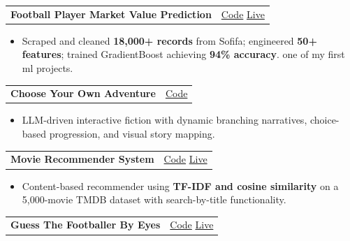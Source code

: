 \documentclass[10.5pt, a4paper]{article}
\makeatletter
\newcommand{\proj}[3]{%
  \vspace{1pt}%
  \begin{tabularx}{\linewidth}{@{}X r@{}}
    \textbf{#1}\enspace{\small\color{mid}\textit{#2}} & {\small #3}
  \end{tabularx}\vspace{0pt}}
\makeatother
\begin{document}
\proj{Football Player Market Value Prediction}
     {--- ML Pipeline}
     {\href{https://github.com/paudelsamir/Player-Value-Prediction}{Code}
      \enspace\textbar\enspace
      \href{https://paudelsamir.streamlit.app/}{Live}}

\begin{itemize}
  \item Scraped and cleaned \textbf{18,000+ records} from Sofifa; engineered \textbf{50+ features};
        trained GradientBoost achieving \textbf{94\% accuracy}. one of my first ml projects.
\end{itemize}

\vspace{4pt}

\proj{Choose Your Own Adventure}
     {--- GenAI Application}
     {\href{https://github.com/paudelsamir/Choose-Your-Own-Adventure}{Code}}

\begin{itemize}
  \item LLM-driven interactive fiction with dynamic branching narratives,
        choice-based progression, and visual story mapping.
\end{itemize}

\vspace{4pt}


\proj{Movie Recommender System}
     {--- Recommender System}
     {\href{https://github.com/paudelsamir/movie-recommender}{Code}
      \enspace\textbar\enspace
      \href{https://movie-recommender-samir.streamlit.app/}{Live}}

\begin{itemize}
  \item Content-based recommender using \textbf{TF-IDF and cosine similarity}
        on a 5,000-movie TMDB dataset with search-by-title functionality.
\end{itemize}

\vspace{4pt}

\proj{Guess The Footballer By Eyes}
     {--- Computer Vision}
     {\href{https://github.com/paudelsamir/365DaysOfData/tree/main/10-Projects-Based-ML-DL/01-Image-Classification/Guess-The-Footballer-By-Eyes}{Code}
      \enspace\textbar\enspace
      \href{https://guess-footballer-with-eyes.streamlit.app/}{Live}}
\end{document}
